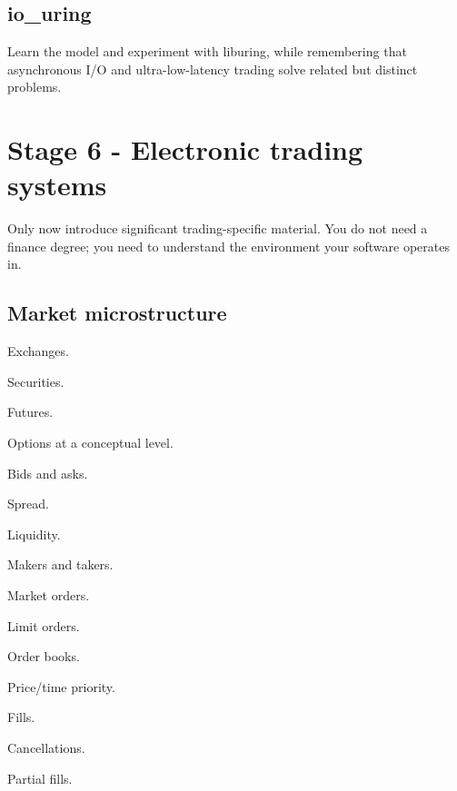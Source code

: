 \documentclass[11pt,letterpaper]{article}
\begin{document}
\subsection*{io\_uring}

Learn the model and experiment with liburing, while remembering that asynchronous I/O and ultra-low-latency trading solve related but distinct problems.

\section{Stage 6 - Electronic trading systems}\label{sec:10}

\label{stage:6}

Only now introduce significant trading-specific material. You do not need a finance degree; you need to understand the environment your software operates in.

\subsection*{Market microstructure}

\begin{topics}

\item Exchanges.

\item Securities.

\item Futures.

\item Options at a conceptual level.

\item Bids and asks.

\item Spread.

\item Liquidity.

\item Makers and takers.

\item Market orders.

\item Limit orders.

\item Order books.

\item Price/time priority.

\item Fills.

\item Cancellations.

\item Partial fills.

\end{topics}
\end{document}
